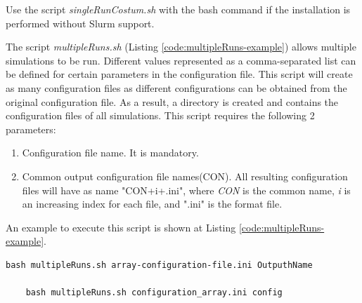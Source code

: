 Use the script \textit{singleRunCostum.sh} with the bash command if the installation is performed without Slurm support.

The script \textit{multipleRuns.sh} (Listing \ref{code:multipleRuns-example}) allows multiple simulations to be run. Different values represented as a comma-separated list can be defined for certain parameters in the configuration file. This script will create as many configuration files as different configurations can be obtained from the original configuration file.
As a result, a directory is created and contains the configuration files of all simulations. This script requires the following 2 parameters:
\begin{enumerate}
    \item Configuration file name. It is mandatory.
    \item Common output configuration file names(CON). All resulting configuration files will have as name "CON+i+.ini", where \textit{CON} is the common name, \textit{i} is an increasing index for each file, and ".ini" is the format file.
   
\end{enumerate}
An example to execute this script is shown at Listing \ref{code:multipleRuns-example}. %

\begin{lstlisting}[float,caption=Script \textit{multipleRuns.sh} example of use., label=code:multipleRuns-example, captionpos=b]
    bash multipleRuns.sh array-configuration-file.ini OutputhName

    bash multipleRuns.sh configuration_array.ini config
\end{lstlisting}


